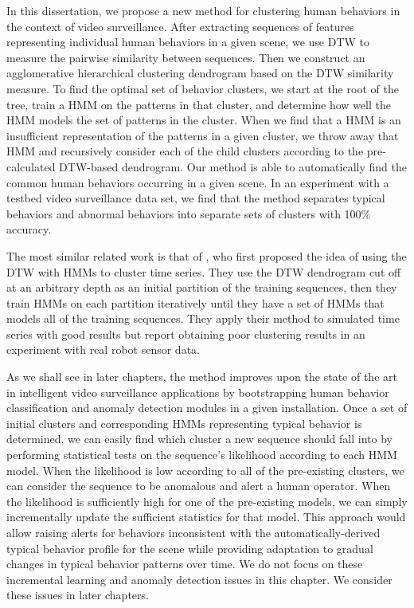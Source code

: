 In this dissertation, we propose a new method for clustering human
behaviors in the context of video surveillance.  After extracting
sequences of features representing individual human behaviors in a
given scene, we use DTW to measure the pairwise similarity between
sequences. Then we construct an agglomerative hierarchical clustering
dendrogram based on the DTW similarity measure. To find the optimal
set of behavior clusters, we start at the root of the tree, train a
HMM on the patterns in that cluster, and determine how well the HMM
models the set of patterns in the cluster.  When we find that a HMM is
an insufficient representation of the patterns in a given cluster, we
throw away that HMM and recursively consider each of the child
clusters according to the pre-calculated DTW-based dendrogram. Our
method is able to automatically find the common human behaviors
occurring in a given scene. In an experiment with a testbed video
surveillance data set, we find that the method separates typical
behaviors and abnormal behaviors into separate sets of clusters with
100\% accuracy.

The most similar related work is that
of , who first proposed the idea of
using the DTW with HMMs to cluster time series. They use the DTW
dendrogram cut off at an arbitrary depth as an initial partition of
the training sequences, then they train HMMs on each partition
iteratively until they have a set of HMMs that models all of the
training sequences.  They apply their method to simulated time series
with good results but report obtaining poor clustering results in an
experiment with real robot sensor data.

As we shall see in later chapters, the method improves upon the state
of the art in intelligent video surveillance applications by
bootstrapping human behavior classification and anomaly detection
modules in a given installation. Once a set of initial clusters and
corresponding HMMs representing typical behavior is determined, we can
easily find which cluster a new sequence should fall into by
performing statistical tests on the sequence's likelihood according to
each HMM model.  When the likelihood is low according to all of the
pre-existing clusters, we can consider the sequence to be anomalous
and alert a human operator. When the likelihood is sufficiently high
for one of the pre-existing models, we can simply incrementally update
the sufficient statistics for that model.  This approach would allow
raising alerts for behaviors inconsistent with the
automatically-derived typical behavior profile for the scene while
providing adaptation to gradual changes in typical behavior patterns
over time. We do not focus on these incremental learning and anomaly
detection issues in this chapter. We consider these issues in later
chapters.


